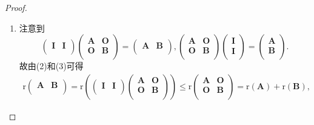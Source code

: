 \documentclass[../../main.tex]{subfiles}
\begin{document}
\begin{proof}
\begin{enumerate}[(1)]
\item  注意到
\[
\left( \begin{matrix}
\boldsymbol{I}&		\boldsymbol{I}\\
\end{matrix} \right) \left( \begin{matrix}
\boldsymbol{A}&		\boldsymbol{O}\\
\boldsymbol{O}&		\boldsymbol{B}\\
\end{matrix} \right) =\left( \begin{matrix}
\boldsymbol{A}&		\boldsymbol{B}\\
\end{matrix} \right) ,\left( \begin{matrix}
\boldsymbol{A}&		\boldsymbol{O}\\
\boldsymbol{O}&		\boldsymbol{B}\\
\end{matrix} \right) \left( \begin{array}{c}
\boldsymbol{I}\\
\boldsymbol{I}\\
\end{array} \right) =\left( \begin{array}{c}
\boldsymbol{A}\\
\boldsymbol{B}\\
\end{array} \right) .
\]
故由(2)和(3)可得
\begin{align*}
\mathrm{r}\left( \begin{matrix}
\boldsymbol{A}&		\boldsymbol{B}\\
\end{matrix} \right) =\mathrm{r}\left( \left( \begin{matrix}
\boldsymbol{I}&		\boldsymbol{I}\\
\end{matrix} \right) \left( \begin{matrix}
\boldsymbol{A}&		\boldsymbol{O}\\
\boldsymbol{O}&		\boldsymbol{B}\\
\end{matrix} \right) \right) \leqslant \mathrm{r}\left( \begin{matrix}
\boldsymbol{A}&		\boldsymbol{O}\\
\boldsymbol{O}&		\boldsymbol{B}\\
\end{matrix} \right) =\mathrm{r}\left( \boldsymbol{A} \right) +\mathrm{r}\left( \boldsymbol{B} \right) ,

\end{align*}
\end{enumerate}
\end{proof}
\end{document}

